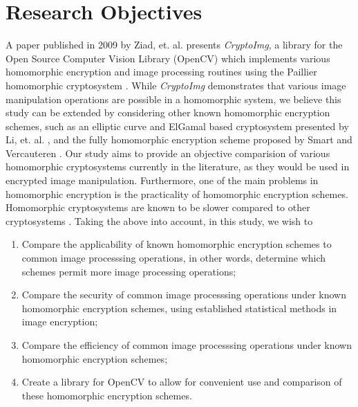 \section{Research Objectives}

A paper published in 2009 by Ziad, et. al. presents \textit{CryptoImg}, a library for the  Open Source Computer Vision Library (OpenCV) \cite{opencv_library} which implements various homomorphic encryption and image processing routines using the Paillier homomorphic cryptosystem \cite{ziad_cryptoimg:_2016}. While \textit{CryptoImg} demonstrates that various image manipulation operations are possible in a homomorphic system, we believe this study can be extended by considering other known homomorphic encryption schemes, such as an elliptic curve and ElGamal based cryptosystem presented by Li, et. al. \cite{li_elliptic_2012}, and the fully homomorphic encryption scheme proposed by Smart and Vercauteren \cite{hutchison_fully_2010}. Our study aims to provide an objective comparision of various homomorphic cryptosystems currently in the literature, as they would be used in encrypted image manipulation.
Furthermore, one of the main problems in homomorphic encryption is the practicality of homomorphic encryption schemes. Homomorphic cryptosystems are known to be slower compared to other cryptosystems \cite{sen_homomorphic_2013}.
Taking the above into account, in this study, we wish to
\begin{enumerate}
    \item Compare the applicability of known homomorphic encryption schemes to common image processsing operations, in other words, determine which schemes permit more image processing operations;
		\item Compare the security of common image processsing operations under known homomorphic encryption schemes, using established statistical methods in image encryption;
    \item Compare the efficiency of common image processsing operations under known homomorphic encryption schemes;
    \item Create a library for OpenCV to allow for convenient use and comparison of these homomorphic encryption schemes.
\end{enumerate}
